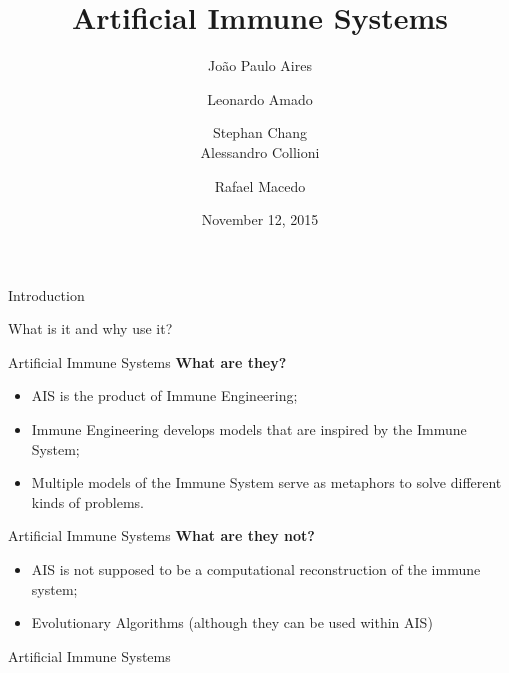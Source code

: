 \documentclass[xcolor=svgnames]{beamer}
\title{Artificial Immune Systems}
\author[Aires, Amado, Chang, Collioni, Macedo]
    {
        João Paulo Aires\and
        Leonardo Amado\and
        Stephan Chang\\ \vspace{0.25em}
        Alessandro Collioni\and
        Rafael Macedo
    }
\date{November 12, 2015}
\institute
    {
        Pontifical Catholic University of Rio Grande do Sul, PUCRS\\
        Porto Alegre -- Brazil
    }
\newcommand{\introframe}[2]{
    \begin{frame}
	   \vfill
	   \hfill\Huge{#1}
	   
	   \vspace{1em}
	   
	   \hfill\Large{#2}
	   \vfill
    \end{frame}
}
\begin{document}
    \maketitle

	\introframe{Introduction}{What is it and why use it?}
	
	\begin{frame}{Artificial Immune Systems}
        \textbf{What are they?}
        
        \begin{itemize}
            \item AIS is the product of Immune Engineering;
				\item Immune Engineering develops models that are inspired by the Immune System;
            \item Multiple models of the Immune System serve as  metaphors to solve different kinds of problems.
        \end{itemize}        
    \end{frame}
    
    \begin{frame}{Artificial Immune Systems}            
        \textbf{What are they not?}
        
        \begin{itemize}
            \item AIS is not supposed to be a computational reconstruction of the immune system;
            \item Evolutionary Algorithms (although they can be used within AIS)
        \end{itemize}    
	\end{frame}
    	
        \begin{frame}{Artificial Immune Systems}
        	\begin{itemize}
         	\end{itemize}
    	\end{frame}
	
\end{document}
